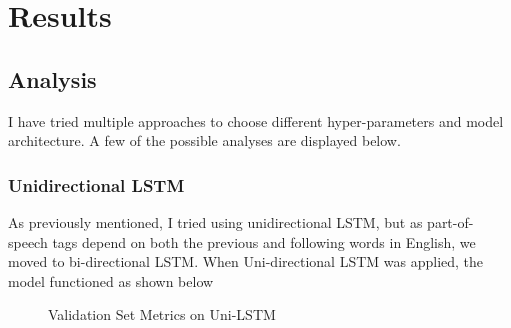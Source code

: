 \section{Results}

\subsection{Analysis}

I have tried multiple approaches to choose different hyper-parameters and model architecture. A few of the possible analyses are displayed below.

\subsubsection{Unidirectional LSTM}
As previously mentioned, I tried using unidirectional LSTM, but as part-of-speech tags depend on both the previous and following words in English, we moved to bi-directional LSTM. When Uni-directional LSTM was applied, the model functioned as shown below

\begin{figure}[h]
    \caption{Validation Set Metrics on Uni-LSTM}
\end{figure}

